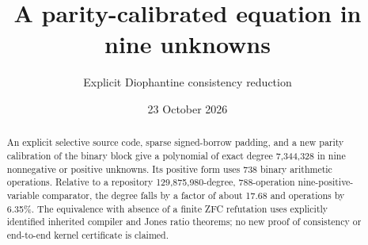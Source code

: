 \documentclass[11pt]{article}
\title{A parity-calibrated equation in nine unknowns}
\author{Explicit Diophantine consistency reduction}
\date{23 October 2026}
\begin{document}
\maketitle
\begin{abstract}
An explicit selective source code, sparse signed-borrow padding, and a new
parity calibration of the binary block give a polynomial of exact degree
7,344,328 in nine nonnegative or positive unknowns. Its positive form uses
738 binary arithmetic operations. Relative to a repository 129,875,980-degree,
788-operation nine-positive-variable comparator, the degree falls by a factor
of about 17.68 and operations by 6.35\%. The equivalence with absence of a
finite ZFC refutation uses explicitly identified inherited compiler and Jones
ratio theorems; no new proof of consistency or end-to-end kernel certificate
is claimed.
\end{abstract}

\end{document}
